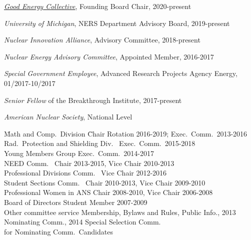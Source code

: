 \textit{\href{https://www.goodenergycollective.org/}{Good Energy Collective}},
Founding Board Chair, 2020-present

\textit{University of Michigan}, NERS Department Advisory Board, 2019-present

\textit{Nuclear Innovation Alliance}, Advisory Committee, 2018-present

\textit{Nuclear Energy Advisory Committee}, Appointed Member, 2016-2017

\textit{Special Government Employee}, Advanced Research Projects Agency Energy, 01/2017-10/2017

\textit{Senior Fellow} of the Breakthrough Institute, 2017-present

\textit{American Nuclear Society}, National Level
\begin{tabbing}
\hspace*{2 em}\= Math and Comp.\ Division \hspace*{6em} \= Chair Rotation 2016-2019; Exec.\ Comm.\ 2013-2016 \\
%
\> Rad.\ Protection and Shielding Div.\ \> Exec.\ Comm.\ 2015-2018\\
%
\> Young Members Group \> Exec.\ Comm.\ 2014-2017\\
%
\> NEED Comm.\ \> Chair 2013-2015, Vice Chair 2010-2013\\
%
\> Professional Divisions Comm.\ \> Vice Chair 2012-2016 \\
%
\> Student Sections Comm.\ \> Chair 2010-2013, Vice Chair 2009-2010\\
%
\> Professional Women in ANS \> Chair 2008-2010, Vice Chair 2006-2008\\	
%
\> Board of Directors \> Student Member 2007-2009\\
%
\> Other committee service \>	Membership, Bylaws and Rules, Public Info., 2013 \\ \> \> Nominating Comm., 2014 Special Selection Comm.\ \\ \> \> for Nominating Comm.\ Candidates
\end{tabbing}

